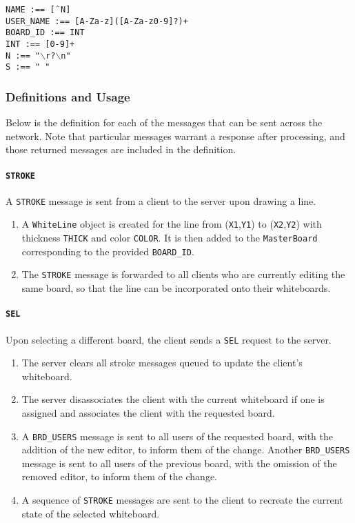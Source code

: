 \texttt{NAME :== [$\char`\^$N]}\\
\texttt{USER\_NAME :== [A-Za-z]([A-Za-z0-9]?)+}\\
\texttt{BOARD\_ID :== INT}\\

\texttt{INT :== [0-9]+}\\
\texttt{N :== "$\backslash$r?$\backslash$n"}\\
\texttt{S :== " "}\\

\setlength{\parindent}{15pt} %

\subsubsection{Definitions and Usage}
Below is the definition for each of the messages that can be sent across the network. Note that particular messages warrant a response after processing, and those returned messages are included in the definition.

\paragraph{\texttt{STROKE}} A \texttt{STROKE} message is sent from a client to the server upon drawing a line.
\begin{enumerate}
\item A \texttt{WhiteLine} object is created for the line from (\texttt{X1},\texttt{Y1}) to (\texttt{X2},\texttt{Y2}) with thickness \texttt{THICK} and color \texttt{COLOR}. It is then added to the \texttt{MasterBoard} corresponding to the provided \texttt{BOARD\_ID}.
\item The \texttt{STROKE} message is forwarded to all clients who are currently editing the same board, so that the line can be incorporated onto their whiteboards.
\end{enumerate}

\paragraph{\texttt{SEL}} Upon selecting a different board, the client sends a \texttt{SEL} request to the server.
\begin{enumerate}
\item The server clears all stroke messages queued to update the client's whiteboard.
\item The server disassociates the client with the current whiteboard if one is assigned and associates the client with the requested board.
\item A \texttt{BRD\_USERS} message is sent to all users of the requested board, with the addition of the new editor, to inform them of the change. Another \texttt{BRD\_USERS} message is sent to all users of the previous board, with the omission of the removed editor, to inform them of the change.
\item A sequence of \texttt{STROKE} messages are sent to the client to recreate the current state of the selected whiteboard.
\end{enumerate}

